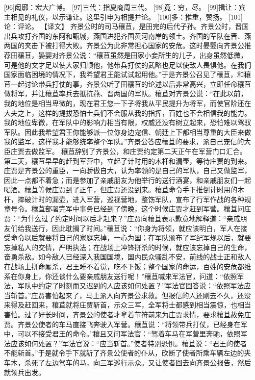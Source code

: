 \documentclass[12pt,UTF8]{ctexbook}
\begin{document}
[96]闳廓：宏大广博。
[97]三代：指夏商周三代。
[98]竟：穷，尽。
[99]揖让：宾主相见的礼仪，以示谦让。这里引申为相提并论。
[100]多：推重，赞扬。
[101]论：评论。
【译文】
齐景公时的司马穰苴，是田完的后代子孙。齐景公时，晋国出兵攻打齐国的东阿和甄城，燕国进犯齐国黄河南岸的领土。齐国的军队在晋、燕两国的夹击下被打得大败。齐景公为此非常担心国家的安危。这时晏婴向齐景公推荐田穰苴，晏婴对齐景公说：“穰苴虽然是田家小妾所生的儿子，出身虽然低微，可是他的文才足以使大家归顺他，他带兵打仗的武略也足以使敌人畏惧他。在我们国家面临困境的情况下，我希望君王能试试起用他。”于是齐景公召见了穰苴，和穰苴一起讨论带兵打仗的事，齐景公听了田穰苴的论述以后非常高兴，立即任命穰苴做将军，并让穰苴率兵去抵抗燕、晋两国的军队。穰苴对齐景公说：“在此以前，我的地位是相当卑微的，现在君王您一下子将我从平民提升为将军，而使官阶还在大夫之上，这样的提拔恐怕士兵们不会服从我的指挥，百姓也不会相信我的能力。我的地位卑微，在军队中的影响力相当有限，权威还没有树立起来，恐怕难以驾驭军队。因此我希望君王你能够派一位你身边宠信、朝廷上下都相当尊重的大臣来做我的监军，这样我才能够统率整个军队。”齐景公答应穰苴的要求，派自己宠信的大臣庄贾去做监军。
穰苴辞别了齐景公，和庄贾约定第二天正午在军营门口汇合。第二天，穰苴早早的赶到军营中，立起了计时用的木杆和漏壶，等待庄贾的到来。庄贾是齐景公的重臣，一向骄傲自大，认为率领的是自己的军队，自己又做监军，因此一点都不着急；而是参加了亲戚朋友为他举行的送行酒宴，和亲戚朋友们一起喝酒。穰苴等候庄贾到了正午，但庄贾还没到来。穰苴命令手下推倒计时用的木杆，摔破计时的漏壶，进入军营，巡视营地，整饬军队，宣布了行军作战的各种规章号令。穰苴部署完军中事务已经到了傍晚，这个时候庄贾才赶到军营。穰苴问庄贾：“为什么过了约定时间以后才赶来？”庄贾向穰苴表示歉意地解释道：“亲戚朋友们给我送行，因此耽搁了时间。”穰苴说：“你身为将领，就应该明白，军人在接受命令以后就要将自己的家庭忘掉，一心为国；在军队颁布了军纪军规以后，就要忘掉私人的交情，严明执法；在战场上冲锋拼杀的时候，就应该忘掉自己的生命，奋勇杀敌。如今敌人已经深入我国国境，国内民众骚乱不安，前线的战士正和敌人在战场上拼命厮杀，君王睡不着觉，吃不下饭；整个国家的命运，百姓的安危都维系在你身上，你还谈什么要亲戚朋友送行呢！”穰苴喊来军法官，问道：“依照军法，军队中约定了时刻而又迟到的人应该如何处置？”军法官回答说：“依照军法应当斩首。”庄贾害怕起来了，马上派人向齐景公求救。但报信的人还刚去不久，还没来得及赶回来，穰苴就将庄贾斩首，示众三军，全军将士都感到相当震惊，也相当害怕。过了好长时间，齐景公的使者才拿着节符前来为庄贾求情，要求穰苴赦免庄贾。齐景公使者的车马直接飞奔驶入军营。穰苴说：“将领带兵打仗，已经身在军中，可以不接受君王的命令。”穰且又问军法官：“驾着车马在军营里奔驰，依照军法应该如何处置？”军法官说：“应当斩首。”使者特别恐惧。穰苴说：“君王的使者不能斩首。”于是就令手下就斩了齐景公使者的仆从，砍断了使者所乘车辆左边的夹车木，杀死了左边驾车的马，向三军巡行示众。又让使者回去向齐景公报告，然后就领兵出发。
\end{document}
